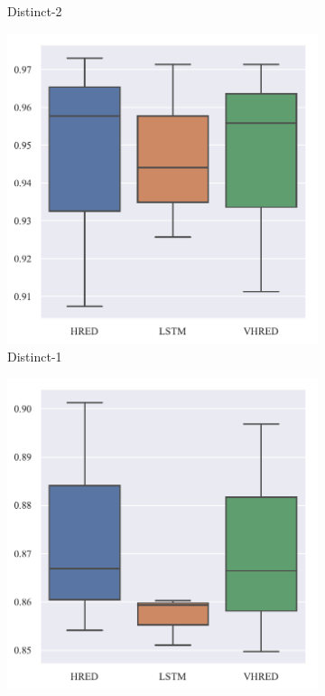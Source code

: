 \begin{figure}[H]
\begin{subfigure}{0.23\linewidth}
        \caption{Distinct-2}
    \end{subfigure}%
    \begin{subfigure}{0.23\linewidth}
        \centering
        \includegraphics[width=\linewidth]{figure/boxplot/model/distinct_1/plot.pdf}
        \caption{Distinct-1}
    \end{subfigure}%
    \begin{subfigure}{0.23\linewidth}
        \centering
        \includegraphics[width=\linewidth]{figure/boxplot/model/distinct_2/plot.pdf}

\end{subfigure}
\end{figure}
